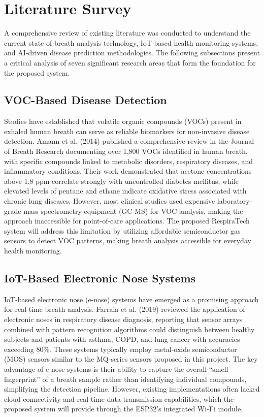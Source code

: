 \chapter{Literature Survey}

A comprehensive review of existing literature was conducted to understand the current state of breath analysis technology, IoT-based health monitoring systems, and AI-driven disease prediction methodologies. The following subsections present a critical analysis of seven significant research areas that form the foundation for the proposed system.

\section{VOC-Based Disease Detection}
Studies have established that volatile organic compounds (VOCs) present in exhaled human breath can serve as reliable biomarkers for non-invasive disease detection. Amann et al. (2014) published a comprehensive review in the Journal of Breath Research documenting over 1,800 VOCs identified in human breath, with specific compounds linked to metabolic disorders, respiratory diseases, and inflammatory conditions. Their work demonstrated that acetone concentrations above 1.8 ppm correlate strongly with uncontrolled diabetes mellitus, while elevated levels of pentane and ethane indicate oxidative stress associated with chronic lung diseases. However, most clinical studies used expensive laboratory-grade mass spectrometry equipment (GC-MS) for VOC analysis, making the approach inaccessible for point-of-care applications. The proposed RespiraTech system will address this limitation by utilizing affordable semiconductor gas sensors to detect VOC patterns, making breath analysis accessible for everyday health monitoring.

\section{IoT-Based Electronic Nose Systems}
IoT-based electronic nose (e-nose) systems have emerged as a promising approach for real-time breath analysis. Farraia et al. (2019) reviewed the application of electronic noses in respiratory disease diagnosis, reporting that sensor arrays combined with pattern recognition algorithms could distinguish between healthy subjects and patients with asthma, COPD, and lung cancer with accuracies exceeding 80\%. These systems typically employ metal-oxide semiconductor (MOS) sensors similar to the MQ-series sensors proposed in this project. The key advantage of e-nose systems is their ability to capture the overall ``smell fingerprint'' of a breath sample rather than identifying individual compounds, simplifying the detection pipeline. However, existing implementations often lacked cloud connectivity and real-time data transmission capabilities, which the proposed system will provide through the ESP32's integrated Wi-Fi module.


